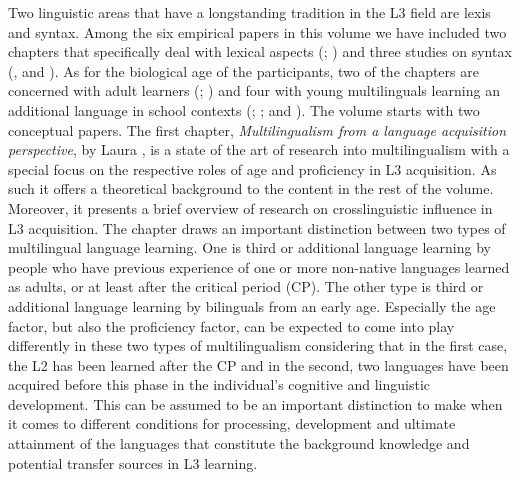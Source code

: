 \documentclass[output=paper,colorlinks,citecolor=brown,nonflat]{langsci/langscibook}
\begin{document}
Two linguistic areas that have a longstanding tradition in the L3 field are lexis and syntax. Among the six empirical papers in this volume we have included two chapters that specifically deal with lexical aspects (\citeauthor{chapters/gudmundson}; \citeauthor{chapters/munoz}) and three studies on syntax (\citeauthor{chapters/sanchez7}, \citeauthor{chapters/sciutti} and \citeauthor{chapters/stadt}). As for the biological age of the participants, two of the chapters are concerned with adult learners (\citeauthor{chapters/gudmundson}; \citeauthor{chapters/sciutti}) and four with young multilinguals learning an additional language in school contexts (\citeauthor{chapters/munoz}; \citeauthor{chapters/pfenninger}; \citeauthor{chapters/sanchez7} and \citeauthor{chapters/stadt}). The volume starts with two conceptual papers. The first chapter, \textit{Multilingualism from a language acquisition perspective}, by Laura \citeauthor{chapters/sanchez1}, is a state of the art of research into multilingualism with a special focus on the respective roles of age and proficiency in L3 acquisition. As such it offers a theoretical background to the content in the rest of the volume. Moreover, it presents a brief overview of research on crosslinguistic influence in L3 acquisition. The chapter draws an important distinction between two types of multilingual language learning. One is third or additional language learning by people who have previous experience of one or more non-native languages learned as adults, or at least after the critical period (CP). The other type is third or additional language learning by bilinguals from an early age. Especially the age factor, but also the proficiency factor, can be expected to come into play differently in these two types of multilingualism considering that in the first case, the L2 has been learned after the CP and in the second, two languages have been acquired before this phase in the individual’s cognitive and linguistic development. This can be assumed to be an important distinction to make when it comes to different conditions for processing, development and ultimate attainment of the languages that constitute the background knowledge and potential transfer sources in L3 learning.
\end{document}
